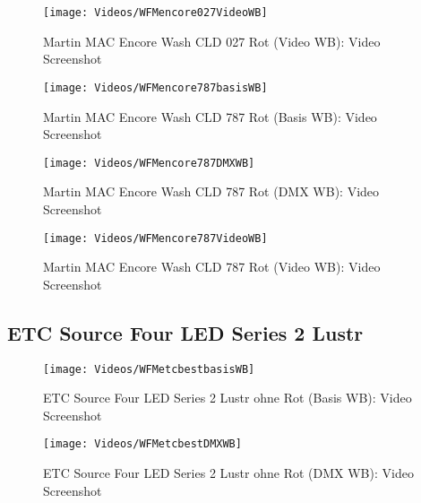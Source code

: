 \documentclass[pagesize,paper=A4,fontsize=12pt,utf8,numbers=noenddot,bibliography=totoc,listof=totoc,DIV=11,BCOR=1mm]{scrreprt}
\begin{document}
\begin{figure}[htp]     %
\centering
\texttt{[image: Videos/WFMencore027VideoWB]} 
\caption {Martin MAC Encore Wash CLD 027 Rot (Video WB): Video Screenshot} 
\end{figure}



\begin{figure}[htp]     %
\centering
\texttt{[image: Videos/WFMencore787basisWB]} 
\caption {Martin MAC Encore Wash CLD 787 Rot (Basis WB): Video Screenshot} 
\end{figure}

\begin{figure}[htp]     %
\centering
\texttt{[image: Videos/WFMencore787DMXWB]} 
\caption {Martin MAC Encore Wash CLD 787 Rot (DMX WB): Video Screenshot} 
\end{figure}

\begin{figure}[htp]     %
\centering
\texttt{[image: Videos/WFMencore787VideoWB]} 
\caption {Martin MAC Encore Wash CLD 787 Rot (Video WB): Video Screenshot} 
\end{figure}



\subsection{ETC Source Four LED Series 2 Lustr}

\begin{figure}[htp]     %
\centering
\texttt{[image: Videos/WFMetcbestbasisWB]} 
\caption {ETC Source Four LED Series 2 Lustr ohne Rot (Basis WB): Video Screenshot} 
\end{figure}

\begin{figure}[htp]     %
\centering
\texttt{[image: Videos/WFMetcbestDMXWB]} 
\caption {ETC Source Four LED Series 2 Lustr ohne Rot (DMX WB): Video Screenshot} 
\end{figure}
\end{document}
